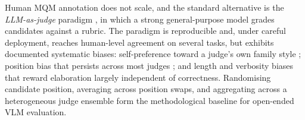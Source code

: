 Human MQM annotation does not scale, and the standard
alternative is the \emph{LLM-as-judge} paradigm
\citep{zheng2023judging}, in which a strong general-purpose
model grades candidates against a rubric. The paradigm is
reproducible and, under careful deployment, reaches
human-level agreement on several tasks, but exhibits
documented systematic biases: self-preference toward a judge's
own family style \citep{wataoka2024selfpref}; position bias
that persists across most judges \citep{zheng2023judging}; and
length and verbosity biases that reward elaboration largely
independent of correctness. Randomising candidate position,
averaging across position swaps, and aggregating across a
heterogeneous judge ensemble form the methodological baseline
for open-ended VLM evaluation.
